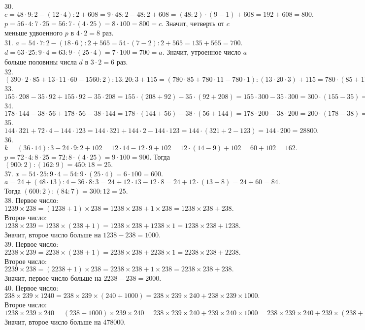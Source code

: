 30. $c=48\cdot9:2-(12\cdot4):2+608=9\cdot48:2-48:2+608=(48:2)\cdot(9-1)+608=192+608=800.$\\
$p=56\cdot4:7\cdot25=56:7\cdot(4\cdot25)=8\cdot100=800=c.$ Значит, четверть от $c$ меньше удвоенного $p$ в $4\cdot2=8$ раз.\\
31. $a=54\cdot7:2-(18\cdot6):2+565=54\cdot(7-2):2+565=135+565=700.$ $d=63\cdot25:9\cdot4=63:9\cdot(25\cdot4)=7\cdot 100=700=a.$
Значит, утроенное число $a$ больше половины числа $d$ в $3\cdot2=6$ раз.\\
32. $(390\cdot2\cdot85+13\cdot11\cdot60-1560:2):13:20:3+115=(780\cdot85+780\cdot11-780\cdot1):(13\cdot20\cdot3)+115=780\cdot(85+11-1):780+115=95+115=210.$\\
33. $155\cdot208-35\cdot92+155\cdot92-35\cdot208=155\cdot(208+92)-35\cdot(92+208)=155\cdot300-35\cdot300=300\cdot(155-35)=300\cdot120=36000.$\\
34. $178\cdot144-38\cdot56+178\cdot56-38\cdot144=178\cdot(144+56)-38\cdot(56+144)=178\cdot200-38\cdot200=200\cdot(178-38)=200\cdot140=28000.$\\
35. $144\cdot321+72\cdot4-144\cdot123=144\cdot321+144\cdot2-144\cdot123=144\cdot(321+2-123)=144\cdot200=28800.$\\
36. $k=(36\cdot14):3-24\cdot9:2+102=12\cdot14-12\cdot9+102=12\cdot(14-9)+102=60+102=162.$ $p=72\cdot4:8\cdot25=72:8\cdot(4\cdot25)=9\cdot100=900.$ Тогда
$(900:2):(162:9)=450:18=25.$\\
37. $x=54\cdot25:9\cdot4=54:9\cdot(25\cdot4)=6\cdot100=600.$ $a=24+(48\cdot13):4-36\cdot8:3=24+12\cdot13-12\cdot8=24+12\cdot(13-8)=24+60=84.$ Тогда
$(600:2):(84:7)=300:12=25.$\\
38. Первое число:$1239\times238=(1238+1)\times238=1238\times238+1\times238=1238\times238+238.$ Второе число: $1238\times239=1238\times(238+1)=1238\times238+1238\times1=1238\times238+1238.$ Значит, второе число больше на $1238-238=1000.$\\
39. Первое число:$2238\times239=2238\times(238+1)=2238\times238+2238\times1=2238\times238+2238.$ Второе число: $2239\times238=(2238+1)\times238=
2238\times238+1\times238=2238\times238+238.$ Значит, первое число больше на $2238-238=2000.$\\
40. Первое число: $238\times239\times1240=238\times239\times(240+1000)=238\times239\times240+238\times239\times1000.$ Второе число: $1238\times239\times240=(238+1000)\times239\times240=238\times239\times240+239\times240\times1000=238\times239\times240+239\times(238+2)\times1000=
238\times239\times240+239\times238\times1000+239\times2\times1000=238\times239\times240+239\times238\times1000+478000.$ Значит, второе число больше на 478000.\\
